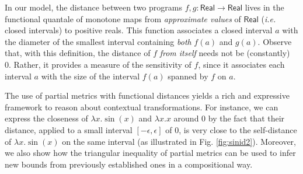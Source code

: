 In our model, 
the distance between  two programs $f,g:\mathsf{Real}\to \mathsf{Real}$ lives in the functional quantale of monotone maps from \emph{approximate values} of $\mathsf{Real}$ (\emph{i.e.} closed intervals) to positive reals. This function associates a closed interval $a$ with the diameter of the smallest interval containing \emph{both} $f(a)$ and $g(a)$. 
Observe that, with this definition,  the distance of $f$ \emph{from itself} needs not be (constantly) 0. Rather, it  provides a measure of the sensitivity of $f$, since it associates each interval $a$ with the size of the interval $f(a)$ spanned by $f$ on $a$. %





The use of partial metrics with functional distances yields a rich and expressive framework to reason about  
contextual transformations. For instance, we can express the closeness of $\lambda x.\sin(x)$ and $\lambda x.x$ around 0 by the fact that their distance, applied to a small interval $[-\epsilon,\epsilon]$ of 0, is very close to the {self-distance} of
$\lambda x.\sin(x)$ on the same interval (as illustrated in Fig. \ref{fig:sinid2}). Moreover, we also show how the triangular inequality of partial metrics can be used to infer new bounds from previously established ones in a compositional way.

%

